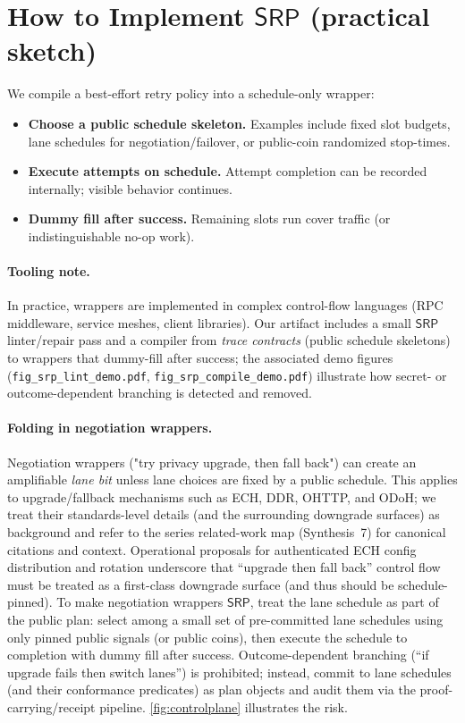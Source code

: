\documentclass[11pt]{article}
\newcommand{\SRP}{\ensuremath{\mathsf{SRP}}}
\begin{document}
\section{How to Implement \texorpdfstring{\SRP}{SRP} (practical sketch)}
We compile a best-effort retry policy into a schedule-only wrapper:
\begin{itemize}[leftmargin=*]
  \item \textbf{Choose a public schedule skeleton.} Examples include fixed slot budgets, lane schedules for negotiation/failover, or public-coin randomized stop-times.
  \item \textbf{Execute attempts on schedule.} Attempt completion can be recorded internally; visible behavior continues.
  \item \textbf{Dummy fill after success.} Remaining slots run cover traffic (or indistinguishable no-op work).
\end{itemize}

\paragraph{Tooling note.}
In practice, wrappers are implemented in complex control-flow languages (RPC middleware, service meshes, client libraries).
Our artifact includes a small \SRP linter/repair pass and a compiler from \emph{trace contracts} (public schedule skeletons) to wrappers that dummy-fill after success;
the associated demo figures (\texttt{fig\_srp\_lint\_demo.pdf}, \texttt{fig\_srp\_compile\_demo.pdf}) illustrate how secret- or outcome-dependent branching is detected and removed.

\paragraph{Folding in negotiation wrappers.}
Negotiation wrappers ("try privacy upgrade, then fall back") can create an amplifiable \emph{lane bit} unless lane choices are fixed by a public schedule.
This applies to upgrade/fallback mechanisms such as ECH, DDR, OHTTP, and ODoH; we treat their standards-level details (and the surrounding downgrade surfaces) as background and refer to the series related-work map (Synthesis~7) for canonical citations and context.\cite{series:relatedworkmap}
Operational proposals for authenticated ECH config distribution and rotation underscore that ``upgrade then fall back'' control flow must be treated as a first-class downgrade surface (and thus should be schedule-pinned).\cite{draftSullivanSignedEchUpdates2025}
To make negotiation wrappers \SRP, treat the lane schedule as part of the public plan: select among a small set of pre-committed lane schedules using only pinned public signals (or public coins), then execute the schedule to completion with dummy fill after success.
Outcome-dependent branching (``if upgrade fails then switch lanes'') is prohibited; instead, commit to lane schedules (and their conformance predicates) as plan objects and audit them via the proof-carrying/receipt pipeline.\cite{series:proofcarryingbudgets,series:releaseproperty}
\cref{fig:controlplane} illustrates the risk.
\end{document}
